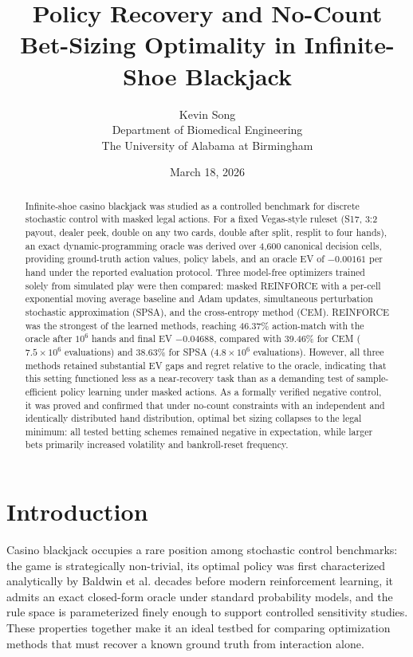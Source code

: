 \documentclass[12pt]{article}
\title{\large\bfseries Policy Recovery and No-Count Bet-Sizing Optimality in
Infinite-Shoe Blackjack}
\author{Kevin Song\\[4pt]
  \small Department of Biomedical Engineering\\
  \small The University of Alabama at Birmingham}
\date{March 18, 2026}
\begin{document}
\maketitle
\thispagestyle{titlepage}

\begin{abstract}
\noindent
Infinite-shoe casino blackjack was studied as a controlled benchmark for discrete
stochastic control with masked legal actions.  For a fixed Vegas-style ruleset
(S17, 3:2 payout, dealer peek, double on any two cards, double after split, resplit
to four hands), an exact dynamic-programming oracle was derived over 4,600 canonical
decision cells, providing ground-truth action values, policy labels, and an oracle
EV of $-0.00161$ per hand under the reported evaluation protocol.  Three model-free
optimizers trained solely from simulated play were then compared: masked REINFORCE
with a per-cell exponential moving average baseline and Adam updates, simultaneous
perturbation stochastic approximation (SPSA), and the cross-entropy method (CEM).
REINFORCE was the strongest of the learned methods, reaching 46.37\% action-match
with the oracle after $10^6$ hands and final EV $-0.04688$, compared with 39.46\%
for CEM ($7.5 \times 10^6$ evaluations) and 38.63\% for SPSA
($4.8 \times 10^6$ evaluations).  However, all three methods retained substantial EV
gaps and regret relative to the oracle, indicating that this setting functioned less
as a near-recovery task than as a demanding test of sample-efficient policy learning
under masked actions.  As a formally verified negative control, it was proved and
confirmed that under no-count constraints with an independent and identically
distributed hand distribution, optimal bet sizing collapses to the legal minimum:
all tested betting schemes remained negative in expectation, while larger bets
primarily increased volatility and bankroll-reset frequency.
\end{abstract}

\newpage
\doublespacing

\section{Introduction}

Casino blackjack occupies a rare position among stochastic control benchmarks:
the game is strategically non-trivial, its optimal policy was first characterized
analytically by Baldwin et al.\cite{Baldwin1956} decades before modern reinforcement
learning, it admits an exact closed-form oracle under standard probability models,
and the rule space is parameterized finely enough to support controlled sensitivity
studies.  These properties together make it an ideal testbed for comparing
optimization methods that must recover a known ground truth from interaction alone.
\end{document}
